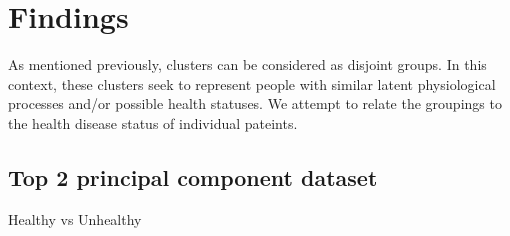 \documentclass[letterpaper,10pt,english]{jupyterBook}
\begin{document}
\section{Findings}
\label{\detokenize{Clustering_Analysis:findings}}
\sphinxAtStartPar
As mentioned previously, clusters can be considered as disjoint groups. In this context, these clusters seek to represent people with similar latent physiological processes and/or possible health statuses. We attempt to relate the groupings to the health disease status of individual pateints.


\subsection{Top 2 principal component dataset}
\label{\detokenize{Clustering_Analysis:top-2-principal-component-dataset}}
\sphinxAtStartPar
Healthy vs Unhealthy
\end{document}
